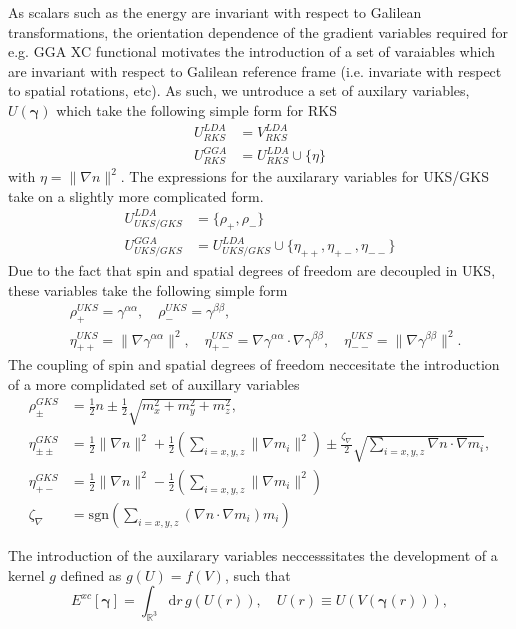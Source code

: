 \documentclass[11pt]{article}
\newcommand{\opdm}[0]{\boldsymbol{\gamma}}
\newcommand{\dd}[1]{\mathrm{d}{#1}\,}
\begin{document}
As scalars such as the energy are invariant with respect to Galilean transformations, the orientation
dependence of the gradient variables required for e.g. GGA XC functional motivates the introduction 
of a set of varaiables which are invariant with respect to Galilean reference frame (i.e.
invariate with respect to spatial rotations, etc). As such, we untroduce a set of auxilary variables,
$U(\opdm)$ which take the following simple form for RKS
\begin{align}
U^{LDA}_{RKS}     &= V^{LDA}_{RKS} \\
U^{GGA}_{RKS}     &= U^{LDA}_{RKS} \cup \{ \eta \}
\end{align}
with $\eta = \| \nabla n \|^2$.
The expressions for the auxilarary variables for UKS/GKS take on a slightly more complicated form.
\begin{align}
U^{LDA}_{UKS/GKS} &= \{\rho_+, \rho_-\} \\
U^{GGA}_{UKS/GKS} &= U^{LDA}_{UKS/GKS} \cup \{ \eta_{++}, \eta_{+-}, \eta_{--}\}
\end{align}
Due to the fact that spin and spatial degrees of freedom are decoupled in UKS, these variables
take the following simple form
\begin{align}
&\rho_+^{UKS}    = \gamma^{\alpha\alpha}, \quad
\rho_-^{UKS}    = \gamma^{\beta\beta},   \\
&\eta_{++}^{UKS} = \|\nabla \gamma^{\alpha\alpha} \|^2, \quad
\eta_{+-}^{UKS} = \nabla \gamma^{\alpha\alpha} \cdot \nabla \gamma^{\beta\beta} , \quad
\eta_{--}^{UKS} = \|\nabla \gamma^{\beta\beta} \|^2. 
\end{align}
The coupling of spin and spatial degrees of freedom neccesitate the introduction of a more
complidated set of auxillary variables
\begin{align}
\rho_\pm^{GKS}      &= \frac{1}{2}n \pm \frac{1}{2}\sqrt{m_x^2 + m_y^2 + m_z^2}, \\
\eta_{\pm\pm}^{GKS} &= \frac{1}{2}\|\nabla n\|^2 + \frac{1}{2}\left( \sum_{i=x,y,z} \| \nabla m_i \|^2 \right) \pm 
                       \frac{\zeta_\nabla}{2} \sqrt{\sum_{i=x,y,z} \nabla n \cdot \nabla m_i}, \\
\eta_{+-}^{GKS}     &= \frac{1}{2}\|\nabla n\|^2 - \frac{1}{2}\left( \sum_{i=x,y,z} \| \nabla m_i \|^2 \right)  \\
\zeta_{\nabla}      &= \mathrm{sgn}\left( \sum_{i=x,y,z} (\nabla n \cdot \nabla m_i) m_i \right)
\end{align}

The introduction of the auxilarary variables neccesssitates the development of a kernel $g$ defined as
$g(U) = f(V)$, such that
\begin{equation}
E^{xc}[\opdm] = \int_{\mathbb{R}^3} \dd{r} g( U(r) ), \quad U(r) \equiv U(V(\opdm(r))),
\end{equation}
\end{document}
